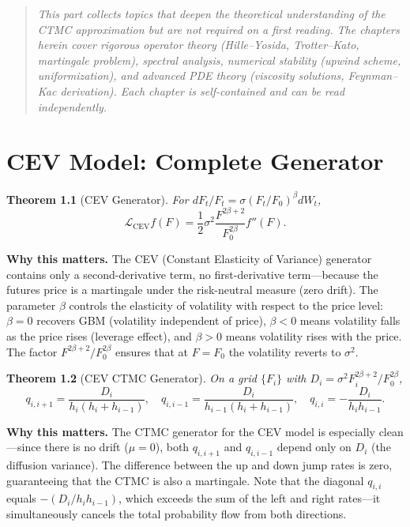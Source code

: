 \documentclass[11pt,a4paper,openany]{book}
\theoremstyle{definition}
\theoremstyle{plain}
\newtheorem{theorem}{Theorem}[chapter]
\theoremstyle{remark}
\newcommand{\1}{\mathbbm{1}}
\newcommand{\calL}{\mathcal{L}}
\begin{document}
\begin{quote}
\itshape This part collects topics that deepen the theoretical understanding of the CTMC approximation but are not required on a first reading. The chapters herein cover rigorous operator theory (Hille--Yosida, Trotter--Kato, martingale problem), spectral analysis, numerical stability (upwind scheme, uniformization), and advanced PDE theory (viscosity solutions, Feynman--Kac derivation). Each chapter is self-contained and can be read independently.
\end{quote}

\chapter{CEV Model: Complete Generator}

\begin{theorem}[CEV Generator]
For $dF_{t}/F_{t} = \sigma (F_{t}/F_{0})^{\beta} dW_{t}$,
\[
\calL_{\text{CEV}} f(F) = \frac{1}{2} \sigma^{2} \frac{F^{2\beta+2}}{F_{0}^{2\beta}} f''(F).
\]
\end{theorem}

\medskip
\noindent\textbf{Why this matters.} The CEV (Constant Elasticity of Variance) generator contains only a second-derivative term, no first-derivative term---because the futures price is a martingale under the risk-neutral measure (zero drift). The parameter $\beta$ controls the elasticity of volatility with respect to the price level: $\beta = 0$ recovers GBM (volatility independent of price), $\beta < 0$ means volatility falls as the price rises (leverage effect), and $\beta > 0$ means volatility rises with the price. The factor $F^{2\beta+2} / F_0^{2\beta}$ ensures that at $F = F_0$ the volatility reverts to $\sigma^2$.

\begin{theorem}[CEV CTMC Generator]
On a grid $\{F_{i}\}$ with $D_{i} = \sigma^{2} F_{i}^{2\beta+2} / F_{0}^{2\beta}$,
\[
q_{i,i+1} = \frac{D_{i}}{h_{i}(h_{i} + h_{i-1})}, \quad
q_{i,i-1} = \frac{D_{i}}{h_{i-1}(h_{i} + h_{i-1})}, \quad
q_{i,i} = -\frac{D_{i}}{h_{i} h_{i-1}}.
\]
\end{theorem}

\medskip
\noindent\textbf{Why this matters.} The CTMC generator for the CEV model is especially clean---since there is no drift ($\mu = 0$), both $q_{i,i+1}$ and $q_{i,i-1}$ depend only on $D_i$ (the diffusion variance). The difference between the up and down jump rates is zero, guaranteeing that the CTMC is also a martingale. Note that the diagonal $q_{i,i}$ equals $-(D_i/h_i h_{i-1})$, which exceeds the sum of the left and right rates---it simultaneously cancels the total probability flow from both directions.
\end{document}
